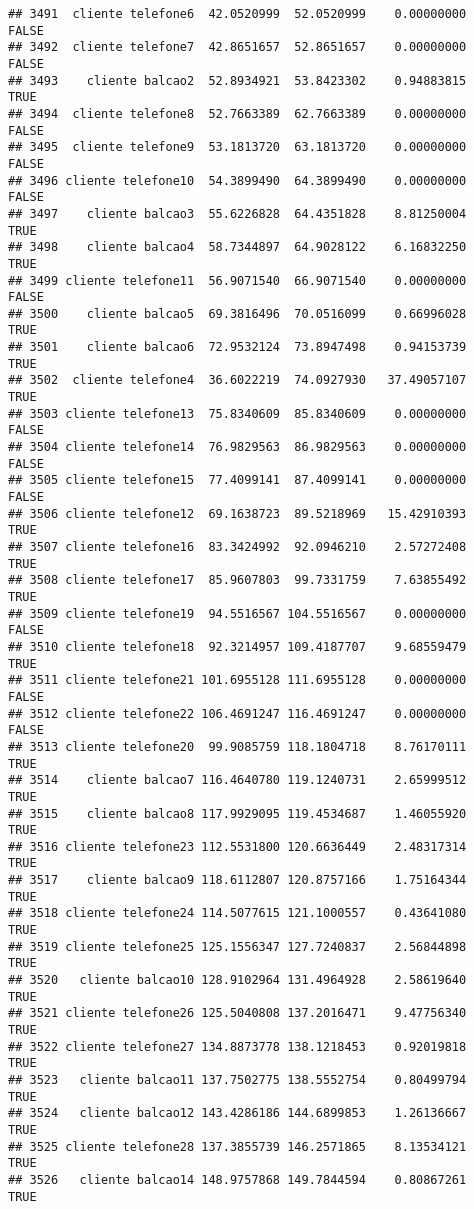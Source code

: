 \documentclass[
]{article}
\begin{document}
\begin{verbatim}
## 3491  cliente telefone6  42.0520999  52.0520999    0.00000000    FALSE
## 3492  cliente telefone7  42.8651657  52.8651657    0.00000000    FALSE
## 3493    cliente balcao2  52.8934921  53.8423302    0.94883815     TRUE
## 3494  cliente telefone8  52.7663389  62.7663389    0.00000000    FALSE
## 3495  cliente telefone9  53.1813720  63.1813720    0.00000000    FALSE
## 3496 cliente telefone10  54.3899490  64.3899490    0.00000000    FALSE
## 3497    cliente balcao3  55.6226828  64.4351828    8.81250004     TRUE
## 3498    cliente balcao4  58.7344897  64.9028122    6.16832250     TRUE
## 3499 cliente telefone11  56.9071540  66.9071540    0.00000000    FALSE
## 3500    cliente balcao5  69.3816496  70.0516099    0.66996028     TRUE
## 3501    cliente balcao6  72.9532124  73.8947498    0.94153739     TRUE
## 3502  cliente telefone4  36.6022219  74.0927930   37.49057107     TRUE
## 3503 cliente telefone13  75.8340609  85.8340609    0.00000000    FALSE
## 3504 cliente telefone14  76.9829563  86.9829563    0.00000000    FALSE
## 3505 cliente telefone15  77.4099141  87.4099141    0.00000000    FALSE
## 3506 cliente telefone12  69.1638723  89.5218969   15.42910393     TRUE
## 3507 cliente telefone16  83.3424992  92.0946210    2.57272408     TRUE
## 3508 cliente telefone17  85.9607803  99.7331759    7.63855492     TRUE
## 3509 cliente telefone19  94.5516567 104.5516567    0.00000000    FALSE
## 3510 cliente telefone18  92.3214957 109.4187707    9.68559479     TRUE
## 3511 cliente telefone21 101.6955128 111.6955128    0.00000000    FALSE
## 3512 cliente telefone22 106.4691247 116.4691247    0.00000000    FALSE
## 3513 cliente telefone20  99.9085759 118.1804718    8.76170111     TRUE
## 3514    cliente balcao7 116.4640780 119.1240731    2.65999512     TRUE
## 3515    cliente balcao8 117.9929095 119.4534687    1.46055920     TRUE
## 3516 cliente telefone23 112.5531800 120.6636449    2.48317314     TRUE
## 3517    cliente balcao9 118.6112807 120.8757166    1.75164344     TRUE
## 3518 cliente telefone24 114.5077615 121.1000557    0.43641080     TRUE
## 3519 cliente telefone25 125.1556347 127.7240837    2.56844898     TRUE
## 3520   cliente balcao10 128.9102964 131.4964928    2.58619640     TRUE
## 3521 cliente telefone26 125.5040808 137.2016471    9.47756340     TRUE
## 3522 cliente telefone27 134.8873778 138.1218453    0.92019818     TRUE
## 3523   cliente balcao11 137.7502775 138.5552754    0.80499794     TRUE
## 3524   cliente balcao12 143.4286186 144.6899853    1.26136667     TRUE
## 3525 cliente telefone28 137.3855739 146.2571865    8.13534121     TRUE
## 3526   cliente balcao14 148.9757868 149.7844594    0.80867261     TRUE

\end{verbatim}
\end{document}
